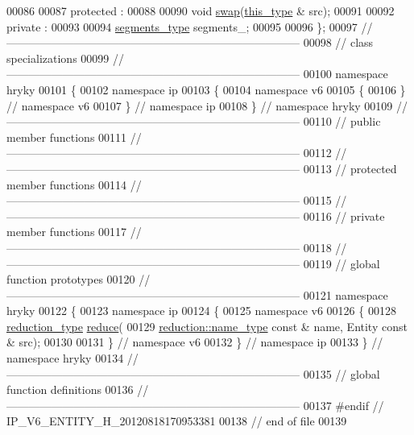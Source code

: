 \begin{DoxyCode}
00086 
00087 \textcolor{keyword}{protected} :
00088 
00090     \textcolor{keywordtype}{void} \hyperlink{classhryky_1_1ip_1_1v6_1_1_entity_a788258640489d598be0473c0f2194de7}{swap}(\hyperlink{classhryky_1_1ip_1_1v6_1_1_entity}{this_type} & src);
00091 
00092 \textcolor{keyword}{private} :
00093 
00094     \hyperlink{classhryky_1_1_array}{segments_type}   segments\_;
00095 
00096 \};
00097 \textcolor{comment}{//
      ------------------------------------------------------------------------------}
00098 \textcolor{comment}{// class specializations}
00099 \textcolor{comment}{//
      ------------------------------------------------------------------------------}
00100 \textcolor{keyword}{namespace }hryky
00101 \{
00102 \textcolor{keyword}{namespace }ip
00103 \{
00104 \textcolor{keyword}{namespace }v6
00105 \{
00106 \} \textcolor{comment}{// namespace v6}
00107 \} \textcolor{comment}{// namespace ip}
00108 \} \textcolor{comment}{// namespace hryky}
00109 \textcolor{comment}{//
      ------------------------------------------------------------------------------}
00110 \textcolor{comment}{// public member functions}
00111 \textcolor{comment}{//
      ------------------------------------------------------------------------------}
00112 \textcolor{comment}{//
      ------------------------------------------------------------------------------}
00113 \textcolor{comment}{// protected member functions}
00114 \textcolor{comment}{//
      ------------------------------------------------------------------------------}
00115 \textcolor{comment}{//
      ------------------------------------------------------------------------------}
00116 \textcolor{comment}{// private member functions}
00117 \textcolor{comment}{//
      ------------------------------------------------------------------------------}
00118 \textcolor{comment}{//
      ------------------------------------------------------------------------------}
00119 \textcolor{comment}{// global function prototypes}
00120 \textcolor{comment}{//
      ------------------------------------------------------------------------------}
00121 \textcolor{keyword}{namespace }hryky
00122 \{
00123 \textcolor{keyword}{namespace }ip
00124 \{
00125 \textcolor{keyword}{namespace }v6
00126 \{
00128     \hyperlink{namespacehryky_a343a9a4c36a586be5c2693156200eadc}{reduction_type} \hyperlink{namespacehryky_af41cb3af6766761da0ff21b84527a52c}{reduce}(
00129         \hyperlink{namespacehryky_1_1reduction_ac686c30a4c8d196bbd0f05629a6b921f}{reduction::name_type} \textcolor{keyword}{const} & name, Entity \textcolor{keyword}{const} & src);
00130 
00131 \} \textcolor{comment}{// namespace v6}
00132 \} \textcolor{comment}{// namespace ip}
00133 \} \textcolor{comment}{// namespace hryky}
00134 \textcolor{comment}{//
      ------------------------------------------------------------------------------}
00135 \textcolor{comment}{// global function definitions}
00136 \textcolor{comment}{//
      ------------------------------------------------------------------------------}
00137 \textcolor{preprocessor}{#endif // IP\_V6\_ENTITY\_H\_20120818170953381}
00138 \textcolor{preprocessor}{}\textcolor{comment}{// end of file}
00139 
\end{DoxyCode}

